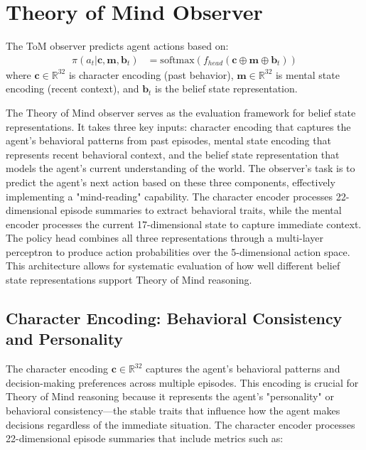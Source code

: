 \documentclass[11pt]{article}
\begin{document}
\section{Theory of Mind Observer}

The ToM observer predicts agent actions based on:
\begin{align}
    \pi(a_t | \mathbf{c}, \mathbf{m}, \mathbf{b}_t) &= \text{softmax}(f_{head}(\mathbf{c} \oplus \mathbf{m} \oplus \mathbf{b}_t))
\end{align}
where $\mathbf{c} \in \mathbb{R}^{32}$ is character encoding (past behavior), $\mathbf{m} \in \mathbb{R}^{32}$ is mental state encoding (recent context), and $\mathbf{b}_t$ is the belief state representation.

The Theory of Mind observer serves as the evaluation framework for belief state representations. It takes three key inputs: character encoding that captures the agent's behavioral patterns from past episodes, mental state encoding that represents recent behavioral context, and the belief state representation that models the agent's current understanding of the world. The observer's task is to predict the agent's next action based on these three components, effectively implementing a "mind-reading" capability. The character encoder processes 22-dimensional episode summaries to extract behavioral traits, while the mental encoder processes the current 17-dimensional state to capture immediate context. The policy head combines all three representations through a multi-layer perceptron to produce action probabilities over the 5-dimensional action space. This architecture allows for systematic evaluation of how well different belief state representations support Theory of Mind reasoning.

\subsection{Character Encoding: Behavioral Consistency and Personality}

The character encoding $\mathbf{c} \in \mathbb{R}^{32}$ captures the agent's behavioral patterns and decision-making preferences across multiple episodes. This encoding is crucial for Theory of Mind reasoning because it represents the agent's "personality" or behavioral consistency—the stable traits that influence how the agent makes decisions regardless of the immediate situation. The character encoder processes 22-dimensional episode summaries that include metrics such as:
\end{document}

